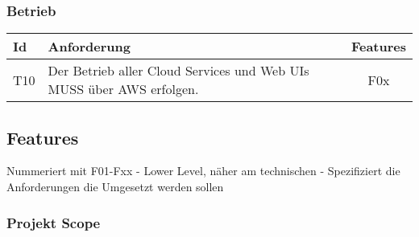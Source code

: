 \subsubsection*{Betrieb}
\begin{table}[h]

    \centering
    \begin{tabular}{|l|p{13cm}|c|}
        \hline
        \textbf{Id} & \textbf{Anforderung}                                                 & \textbf{Features} \\
        \hline
        T10         & Der Betrieb aller Cloud Services und Web UIs MUSS über AWS erfolgen. & F0x               \\
        \hline
    \end{tabular}\label{tab:userstories4}
\end{table}

\clearpage

\subsection{Features}\label{subsec:features}

Nummeriert mit F01-Fxx - Lower Level, näher am technischen - Spezifiziert die Anforderungen die Umgesetzt werden sollen

\subsubsection*{Projekt Scope}


